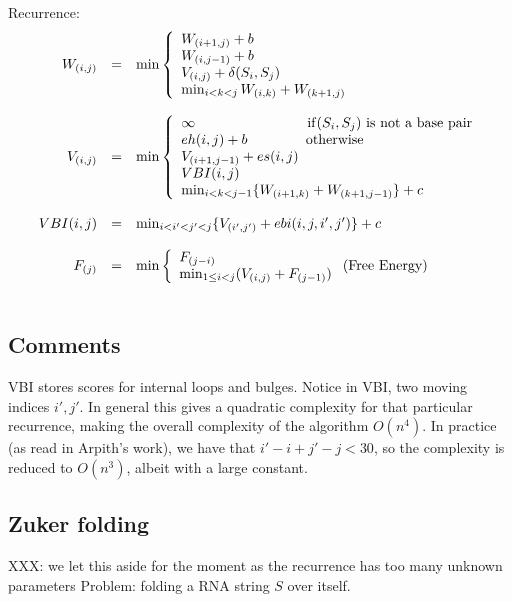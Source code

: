 \documentclass[11pt]{article}
\begin{document}
Recurrence:
\[\begin{array}{rcl}
W_{(i,j)}&=&\min\left\{\begin{array}{l}
	W_{(i+1,j)}+b \\
	W_{(i,j-1)}+b \\
	V_{(i,j)}+\delta(S_i,S_j) \\
	\min_{i<k<j}W_{(i,k)}+W_{(k+1,j)}
\end{array}\right.\\\\

V_{(i,j)}&=&\min\left\{\begin{array}{ll}
	\infty \qquad\qquad\qquad\qquad {\rm if}(S_i,S_j) \text{ is not a base pair}\\
	eh(i,j)+b \qquad\qquad\, \text{otherwise} \\
	V_{(i+1,j-1)}+es(i,j) \\
	VBI(i,j) \\
	\min_{i<k<j-1}\{W_{(i+1,k)}+W_{(k+1,j-1)}\} +c
\end{array}\right.\\\\

VBI(i,j)&=&\min_{i<i'<j'<j}\{V_{(i',j')}+ebi(i,j,i',j')\} +c \\\\

F_{(j)}&=&\min\left\{\begin{array}{ll}
F_{(j-i)} \\
\min_{1\le i< j} (V_{(i,j)} + F_{(j-1)})
\end{array}\right. \text{(Free Energy)}\\\\

\end{array}\]

\subsection{Comments}

VBI stores scores for internal loops and bulges.
Notice in VBI, two moving indices $i', j'$. In general this gives a quadratic complexity for that particular recurrence, making the overall complexity of the algorithm $O(n^4)$. In practice (as read in Arpith's work), we have that $i' - i + j'- j < 30$, so the complexity is reduced to $O(n^3)$, albeit with a large constant.


\newpage
\subsection{Zuker folding}
 XXX: we let this aside for the moment as the recurrence has too many unknown parameters
Problem: folding a RNA string $S$ over itself.
\end{document}
